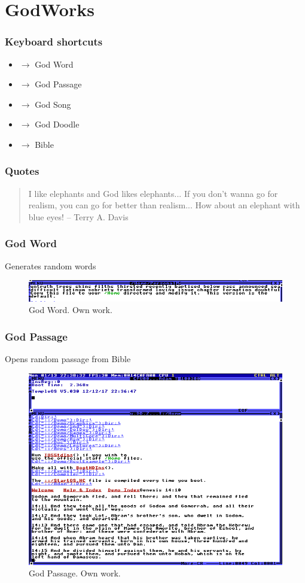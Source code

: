 \documentclass{beamer}
\begin{document}
	\section{GodWorks}
	\begin{frame}
		\frametitle{Keyboard shortcuts}
		\begin{itemize}
			\item {} $\rightarrow$ God Word

			\item {} $\rightarrow$ God Passage

			\item {} $\rightarrow$ God Song

			\item {} $\rightarrow$ God Doodle

			\item {} $\rightarrow$ Bible
		\end{itemize}

		\vspace{1em}

		\frametitle{Quotes}
		\begin{quote}
			I like elephants and God likes elephants... If you don't wanna go for
			realism, you can go for better than realism... How about an elephant with
			blue eyes! \flushright -- Terry A. Davis
		\end{quote}
	\end{frame}

	\begin{frame}
		\frametitle{God Word}
		Generates random words
		\begin{figure}
			\centering
			\includegraphics[width=0.95\linewidth]{images/god_word.png}
			\caption{God Word. Own work.}
			\label{fig:god_work}
		\end{figure}
	\end{frame}

	\begin{frame}
		\frametitle{God Passage}
		Opens random passage from Bible
		\begin{figure}
			\centering
			\includegraphics[width=0.6\linewidth]{images/god_passage.png}
			\caption{God Passage. Own work.}
			\label{fig:god_passage}
		\end{figure}
	\end{frame}
\end{document}
